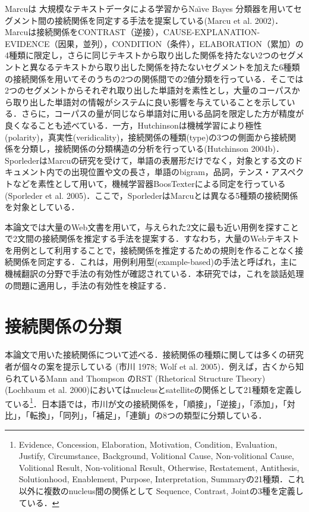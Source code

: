 \documentclass[japanese]{jnlp_1.4}
\begin{document}
Marcuは 大規模なテキストデータによる学習からNa\"{\i}ve Bayes 
分類器を用いてセグメント間の接続関係を同定する手法を提案している(Marcu et al. 2002)．Marcuは接続関係をCONTRAST（逆接），CAUSE-EXPLANATION-EVIDENCE（因果，並列），CONDITION（条件），ELABORATION（累加）の4種類に限定し，さらに同じテキストから取り出した関係を持たない2つのセグメントと異なるテキストから取り出した関係を持たないセグメントを加えた6種類の接続関係を用いてそのうちの2つの関係間での2値分類を行っている．そこでは2つのセグメントからそれぞれ取り出した単語対を素性とし，大量のコーパスから取り出した単語対の情報がシステムに良い影響を与えていることを示している．さらに，コーパスの量が同じなら単語対に用いる品詞を限定した方が精度が良くなることも述べている．一方，Hutchinsonは機械学習により極性(polarity)，真実性(veridicality)，接続関係の種類(type)の3つの側面から接続関係を分類し，接続関係の分類構造の分析を行っている(Hutchinson 2004b)．SporlederはMarcuの研究を受けて，単語の表層形だけでなく，対象とする文のドキュメント内での出現位置や文の長さ，単語のbigram，品詞，テンス・アスペクトなどを素性として用いて，機械学習器BoosTexterによる同定を行っている(Sporleder et al. 2005)．ここで，SporlederはMarcuとは異なる5種類の接続関係を対象としている．

本論文では大量のWeb文書を用いて，与えられた2文に最も近い用例を探すことで2文間の接続関係を推定する手法を提案する．すなわち，大量のWebテキストを用例として利用することで，接続関係を推定するための規則を作ることなく接続関係を同定する．これは，用例利用型(example-based)の手法と呼ばれ，主に機械翻訳の分野で手法の有効性が確認されている．本研究では，これを談話処理の問題に適用し，手法の有効性を検証する．


\section{接続関係の分類}

本論文で用いた接続関係について述べる．接続関係の種類に関しては多くの研究者が個々の案を提示している 
(市川 1978; Wolf et al. 2005)．例えば，古くから知られているMann and 
Thompson のRST (Rhetorical Structure Theory) (Lochbaum et al. 2000)においてはnucleusとsatelliteの関係として21種類を定義している\footnote{
	Evidence, Concession, Elaboration, Motivation, Condition, Evaluation, 
	Justify, Circumstance, Background, Volitional Cause, Non-volitional Cause, 
	Volitional Result, Non-volitional Result, Otherwise, Restatement, 
	Antithesis, Solutionhood, Enablement, Purpose, Interpretation, 
	Summaryの21種類．これ以外に複数のnucleus間の関係として Sequence, Contrast, 
	Jointの3種を定義している．
}．日本語では，市川が文の接続関係を，「順接」，「逆接」，「添加」，「対比」，「転換」，「同列」，「補足」，「連鎖」の8つの類型に分類している．
\end{document}
